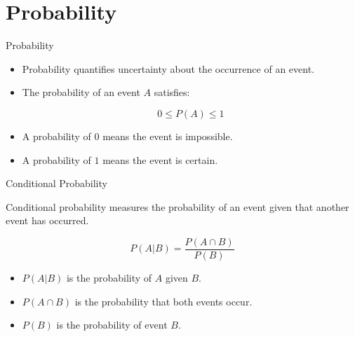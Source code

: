 \documentclass{beamer}
\begin{document}
\section{Probability}

\begin{frame}{Probability}

\begin{itemize}

  \item Probability quantifies uncertainty about the occurrence of an event.

  \vskip 0.4cm

  \item The probability of an event $A$ satisfies:

\[
0 \leq P(A) \leq 1
\]

  \vskip 0.4cm

  \item A probability of $0$ means the event is impossible.

  \item A probability of $1$ means the event is certain.

\end{itemize}

\end{frame}


\begin{frame}{Conditional Probability}

Conditional probability measures the probability of an event given that another event has occurred.

\vskip 0.5cm

\[
P(A|B)
=
\frac{P(A\cap B)}
{P(B)}
\]

\vskip 0.5cm

\begin{itemize}

  \item $P(A|B)$ is the probability of $A$ given $B$.

  \item $P(A\cap B)$ is the probability that both events occur.

  \item $P(B)$ is the probability of event $B$.

\end{itemize}

\end{frame}


\end{document}
